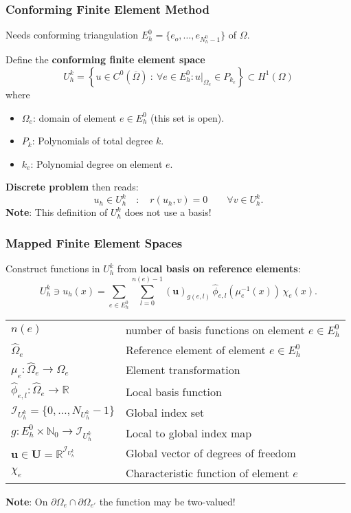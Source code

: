 \begin{frame}
\frametitle{Conforming Finite Element Method}
Needs conforming triangulation $E_h^0 = \{e_o,\ldots,e_{N_h^0-1} \}$ of $\Omega$.

Define the \textbf{conforming finite element space}
\begin{equation*}
U_h^k = \left\{  u\in C^0(\overline{\Omega}) \ : \ \forall e\in E_h^0: u|_{\Omega_e} \in P_{k_e} \right\} \subset H^1(\Omega)
\end{equation*}
where
\begin{itemize}
\item $\Omega_e$: domain of element $e\in E_h^0$ (this set is open).
\item $P_k$: Polynomials of total degree $k$.
\item $k_e$: Polynomial degree on element $e$.
\end{itemize}
\textbf{Discrete problem} then reads:
\begin{equation*}
u_h \in U_h^k \quad : \quad r(u_h,v) = 0 \qquad \forall v \in U_h^k.
\end{equation*}
\textbf{Note}: This definition of $U_h^k$ does not use a basis!
\end{frame}

\begin{frame}
\frametitle{Mapped Finite Element Spaces}
Construct functions in $U_h^k$ from \textbf{local basis on reference elements}:
\begin{equation*}
U_h^k\ni u_h(x) = \sum_{e\in E_h^0} \sum_{l=0}^{n(e)-1} (\mathbf{u})_{g(e,l)}
\, \hat{\phi}_{e,l}(\mu_e^{-1}(x)) \, \chi_e(x).
\end{equation*}
\begin{center}
\begin{tabular}{ll}
$n(e)$ & number of basis functions on element $e\in E_h^0$\\
$\hat\Omega_e$ & Reference element of element $e\in E_h^0$ \\
$\mu_e : \hat\Omega_e \to \Omega_e$ & Element transformation \\
$\hat\phi_{e,l} : \hat\Omega_e \to \mathbb{R}$ & Local basis function\\
$\mathcal{I}_{U_h^k} = \{0,\ldots,N_{U_h^k}-1\}$ & Global index set \\
$g : E_h^0 \times \mathbb{N}_0 \to \mathcal{I}_{U_h^k}$ & Local to global index map \\
$\mathbf{u} \in \mathbf{U} = \mathbb{R}^{\mathcal{I}_{U_h^k}}$ & Global vector of degrees of freedom\\
$\chi_e$ & Characteristic function of element $e$
\end{tabular}
\end{center}
\textbf{Note}: On $\partial\Omega_e \cap \partial\Omega_{e'}$ the function may be two-valued!
\end{frame}

